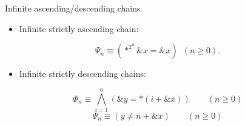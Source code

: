 \documentclass[aspectratio=169]{beamer}
\begin{document}
\begin{frame}{Infinite ascending/descending chains}
    \begin{itemize}
        \item Infinite strictly ascending chain:
    \end{itemize}
    \[
        \Psi_n \equiv (*^{2^n} \&x = \&x)\hspace{6pt} (n\geq 0).
    \]
    \begin{itemize}
        \item Infinite strictly descending chains:
    \end{itemize}
    \[
        \Phi_n \equiv\bigwedge_{i=1}^n (\&y = *(i+\&x))\qquad(n\geq 0)
    \]
    \[
        \Psi_n \equiv (y\neq n+\&x)\qquad(n\geq 0)
    \]
\end{frame}






\end{document}
